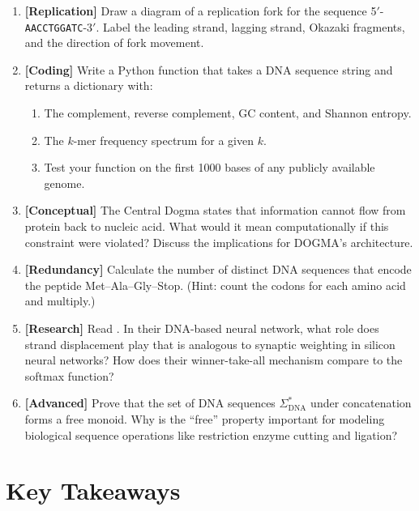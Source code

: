 \begin{enumerate}[label=\textbf{1.\arabic*.}, leftmargin=2.5em]
\item \textbf{[Replication]} Draw a diagram of a replication fork for the sequence 5$'$-\texttt{AACCTGGATC}-3$'$. Label the leading strand, lagging strand, Okazaki fragments, and the direction of fork movement.

\item \textbf{[Coding]} Write a Python function that takes a DNA sequence string and returns a dictionary with:
  \begin{enumerate}[label=(\alph*)]
    \item The complement, reverse complement, GC content, and Shannon entropy.
    \item The $k$-mer frequency spectrum for a given $k$.
    \item Test your function on the first 1000 bases of any publicly available genome.
  \end{enumerate}

\item \textbf{[Conceptual]} The Central Dogma states that information cannot flow from protein back to nucleic acid. What would it mean computationally if this constraint were violated? Discuss the implications for DOGMA's architecture.

\item \textbf{[Redundancy]} Calculate the number of distinct DNA sequences that encode the peptide Met--Ala--Gly--Stop. (Hint: count the codons for each amino acid and multiply.)

\item \textbf{[Research]} Read \citet{cherry2018}. In their DNA-based neural network, what role does strand displacement play that is analogous to synaptic weighting in silicon neural networks? How does their winner-take-all mechanism compare to the softmax function?

\item \textbf{[Advanced]} Prove that the set of DNA sequences $\Sigma_{\mathrm{DNA}}^*$ under concatenation forms a free monoid. Why is the ``free'' property important for modeling biological sequence operations like restriction enzyme cutting and ligation?

\end{enumerate}

\section{Key Takeaways}

